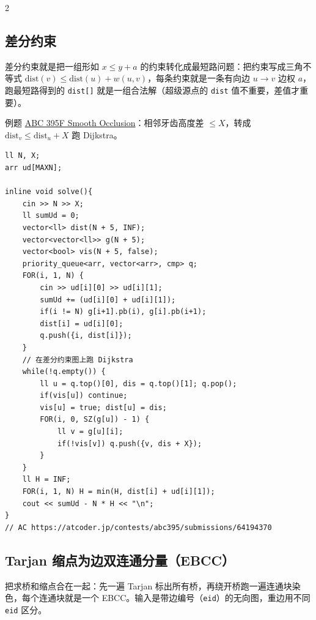 \begin{multicols*}{2}

		\subsection{差分约束}

		差分约束就是把一组形如 $x \leq y + a$ 的约束转化成最短路问题：把约束写成三角不等式 $\mathrm{dist}(v) \leq \mathrm{dist}(u) + w(u, v)$，每条约束就是一条有向边 $u \to v$ 边权 $a$，跑最短路得到的 \texttt{dist[]} 就是一组合法解（超级源点的 \texttt{dist} 值不重要，差值才重要）。

		例题 \href{https://atcoder.jp/contests/abc395/tasks/abc395_f}{ABC 395F Smooth Occlusion}：相邻牙齿高度差 $\leq X$，转成 $\mathrm{dist}_v \leq \mathrm{dist}_u + X$ 跑 Dijkstra。

		\begin{verbatim}
ll N, X;
arr ud[MAXN];

inline void solve(){
    cin >> N >> X;
    ll sumUd = 0;
    vector<ll> dist(N + 5, INF);
    vector<vector<ll>> g(N + 5);
    vector<bool> vis(N + 5, false);
    priority_queue<arr, vector<arr>, cmp> q;
    FOR(i, 1, N) {
        cin >> ud[i][0] >> ud[i][1];
        sumUd += (ud[i][0] + ud[i][1]);
        if(i != N) g[i+1].pb(i), g[i].pb(i+1);
        dist[i] = ud[i][0];
        q.push({i, dist[i]});
    }
    // 在差分约束图上跑 Dijkstra
    while(!q.empty()) {
        ll u = q.top()[0], dis = q.top()[1]; q.pop();
        if(vis[u]) continue;
        vis[u] = true; dist[u] = dis;
        FOR(i, 0, SZ(g[u]) - 1) {
            ll v = g[u][i];
            if(!vis[v]) q.push({v, dis + X});
        }
    }
    ll H = INF;
    FOR(i, 1, N) H = min(H, dist[i] + ud[i][1]);
    cout << sumUd - N * H << "\n";
}
// AC https://atcoder.jp/contests/abc395/submissions/64194370
		\end{verbatim}

		\subsection{Tarjan 缩点为边双连通分量（EBCC）}

		把求桥和缩点合在一起：先一遍 Tarjan 标出所有桥，再绕开桥跑一遍连通块染色，每个连通块就是一个 EBCC。输入是带边编号（\texttt{eid}）的无向图，重边用不同 \texttt{eid} 区分。


\end{multicols*}
